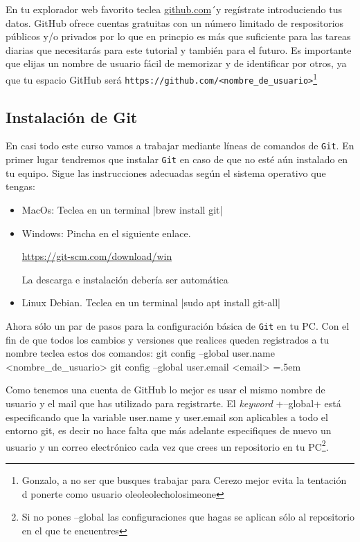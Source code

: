 \documentclass[a5paper, oneside,10pt]{article}
\newenvironment{cverbatim}
 {\SaveVerbatim{cverb}}
 {\endSaveVerbatim
  \flushleft\fboxrule=0pt\fboxsep=.5em
  \colorbox{bg}{\BUseVerbatim{cverb}}%
  \endflushleft
}
\begin{document}
    En tu explorador web favorito teclea \url{github.com}´y regístrate introduciendo tus datos. GitHub ofrece cuentas gratuitas con un número limitado de respositorios públicos y/o privados por lo que en princpio es más que suficiente para las tareas diarias que necesitarás para este tutorial y también para el futuro. Es importante que elijas un nombre de usuario fácil de memorizar y de identificar por otros, ya que tu espacio GitHub será \verb+https://github.com/<nombre_de_usuario>+\footnote{Gonzalo, a no ser que busques trabajar para Cerezo mejor evita la tentación d ponerte como usuario oleoleolecholosimeone}
    
  \subsection{Instalación de Git}
    En casi todo este curso vamos a trabajar mediante líneas de comandos de \verb+Git+. En primer lugar tendremos que instalar \verb+Git+ en caso de que no esté aún instalado en tu equipo. Sigue las instrucciones adecuadas según el sistema operativo que tengas: 
    
    \begin{itemize}
      \item MacOs: Teclea en un terminal
        \cverb|brew install git|

      \item Windows: Pincha en el siguiente enlace. 
      
      \url{https://git-scm.com/download/win}
      
      La descarga e instalación debería ser automática
        
      \item Linux Debian. Teclea en un terminal
        \cverb|sudo apt install git-all|
    \end{itemize}
    Ahora sólo un par de pasos para la configuración básica de \verb+Git+ en tu PC. Con el fin de que todos los cambios y versiones que realices queden registrados a tu nombre teclea estos dos comandos:
    \begin{cverbatim}
git config --global user.name <nombre_de_usuario>
git config --global user.email <email>
    \end{cverbatim}
      
    Como tenemos una cuenta de GitHub lo mejor es usar el mismo nombre de usuario y el mail que has utilizado para registrarte. El \emph{keyword} \cverb+--global+ está especificando que la variable user.name y user.email son aplicables a todo el entorno git, es decir no hace falta que más adelante especifiques de nuevo un usuario y un correo electrónico cada vez que crees un repositorio en tu PC\footnote{Si no pones --global las configuraciones que hagas se aplican sólo al repositorio en el que te encuentres}.
\end{document}
